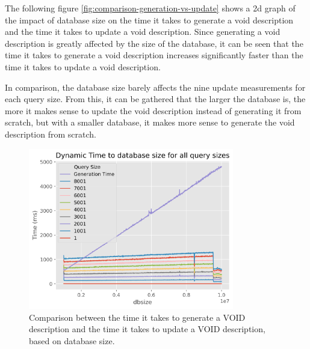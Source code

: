 The following figure \autoref{fig:comparison-generation-vs-update} shows a 2d graph of the impact of database size on the time it takes to generate a \gls{void} description and the time it takes to update a \gls{void} description. Since generating a \gls{void} description is greatly affected by the size of the database, it can be seen that the time it takes to generate a \gls{void} description increases significantly faster than the time it takes to update a \gls{void} description.

In comparison, the database size barely affects the nine update measurements for each query size. From this, it can be gathered that the larger the database is, the more it makes sense to update the \gls{void} description instead of generating it from scratch, but with a smaller database, it makes more sense to generate the \gls{void} description from scratch.


\begin{figure}
    \centering
    \includegraphics[width=0.8\textwidth]{figures/comparison-Generation-vs-Update.png}
    \caption{Comparison between the time it takes to generate a VOID description and the time it takes to update a VOID description, based on database size.}
    \label{fig:comparison-generation-vs-update}
\end{figure}


